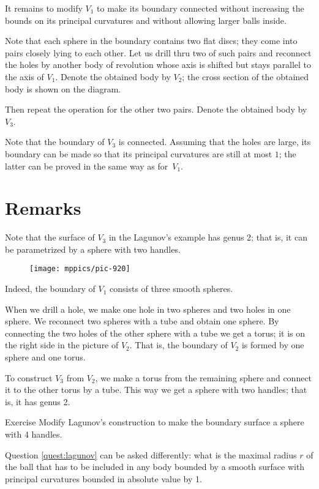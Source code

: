 It remains to modify $V_1$ to make its boundary connected without increasing the bounds on its principal curvatures and  without allowing larger balls inside.

Note that each sphere in the boundary contains two flat discs;
they come into pairs closely lying to each other. 
Let us drill thru two of such pairs and reconnect the holes by another body of revolution whose 
axis is shifted but stays parallel to the axis of $V_1$.
Denote the obtained body by $V_2$; the cross section of the obtained body is shown on the diagram. 

Then repeat the operation for the other two pairs.
Denote the obtained body by $V_3$.

Note that the boundary of $V_3$ is connected.
Assuming that the holes are large, its boundary can be made so that its principal curvatures are still at most $1$; the latter can be proved in the same way as for~$V_1$.
\qeds

\section*{Remarks}

Note that the surface of $V_3$ in the Lagunov's example has genus 2;
that is, it can be parametrized by a sphere with two handles.

\begin{figure}[h!]
\centering
\texttt{[image: mppics/pic-920]}
\vskip0mm
\end{figure}

Indeed, the boundary of $V_1$ consists of three smooth spheres.

When we drill a hole, we make one hole in two spheres and two holes in one sphere.
We reconnect two spheres with a tube and obtain one sphere.
By connecting the two holes of the other sphere with a tube we get a torus;
it is on the right side in the picture of $V_2$.
That is, the boundary of $V_2$ is formed by one sphere and one torus.

To construct $V_3$ from $V_2$, we make a torus from the remaining sphere and connect it to the other torus by a tube.
This way we get a sphere with two handles; that is, it has genus 2.

\begin{thm}{Exercise}\label{ex:lagunov-genus4}
Modify Lagunov's construction to make the boundary surface a sphere with 4 handles.
\end{thm}

Question \ref{quest:lagunov} can be asked differently: what is the maximal radius $r$ of the ball that has to be included in any body bounded by a smooth surface with principal curvatures bounded in absolute value by 1.

